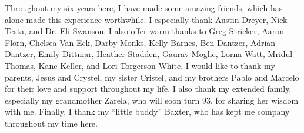\begin{acknowledgment}
Throughout my six years here, I have made some amazing friends,
which has alone made this experience worthwhile.
%
I especially thank Austin Dreyer, Nick Testa, and Dr. Eli Swanson.
%
I also offer warm thanks to Greg Stricker, Aaron Florn, Chelsea Van Eck,
Darby Monks, Kelly Barnes, Ben Dantzer, Adrian Dantzer, Emily Dittmar,
Heather Stadden, Gaurav Moghe, Lorna Watt, Mridul Thomas,
Kane Keller, and Lori Torgerson-White.
%
I would like to thank my parents, Jesus and Crystel,
my sister Cristel, and my brothers Pablo and Marcelo
for their love and support throughout my life.
%
I also thank my extended family, especially my grandmother Zarela,
who will soon turn 93, for sharing her wisdom with me.
%
Finally, I thank my ``little buddy'' Baxter,
who has kept me company throughout my time here.

\end{acknowledgment}
